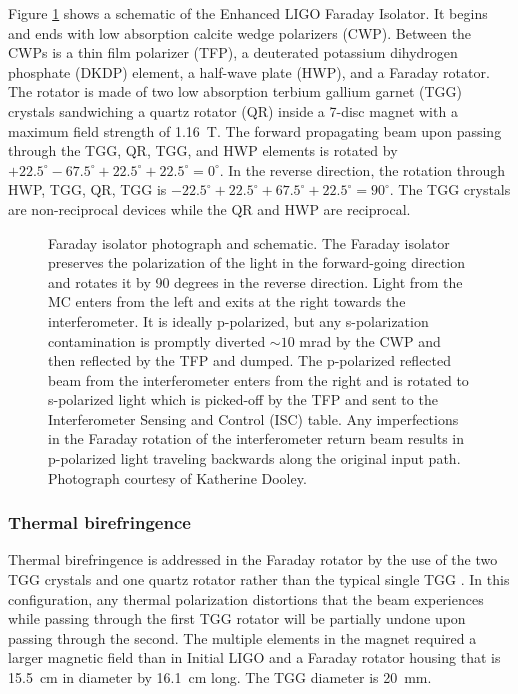 Figure \ref{fig:FI} shows a schematic of the Enhanced LIGO Faraday
Isolator. It begins and ends with low absorption calcite wedge
polarizers (CWP). Between the CWPs is a thin film polarizer (TFP), a
deuterated potassium dihydrogen phosphate (DKDP) element, a half-wave
plate (HWP), and a Faraday rotator. The rotator is made of two low
absorption terbium gallium garnet (TGG) crystals sandwiching a quartz
rotator (QR) inside a 7-disc magnet with a maximum field strength of
1.16~T. The forward propagating beam upon passing through the TGG, QR,
TGG, and HWP elements is rotated by $+22.5^\circ - 67.5^\circ +
22.5^\circ + 22.5^\circ = 0^\circ$. In the reverse direction, the
rotation through HWP, TGG, QR, TGG is $-22.5^\circ + 22.5^\circ +
67.5^\circ + 22.5^\circ = 90^\circ$. The TGG crystals are
non-reciprocal devices while the QR and HWP are reciprocal.

\begin{figure}
\begin{centering}
\caption[Faraday isolator photograph and schematic.]{Faraday isolator
  photograph and schematic. The Faraday isolator preserves the
  polarization of the light in the forward-going direction and rotates
  it by 90 degrees in the reverse direction. Light from the MC enters
  from the left and exits at the right towards the interferometer. It
  is ideally p-polarized, but any s-polarization contamination is
  promptly diverted $\sim 10$ mrad by the CWP and then reflected by
  the TFP and dumped. The p-polarized reflected beam from the
  interferometer enters from the right and is rotated to s-polarized
  light which is picked-off by the TFP and sent to the Interferometer
  Sensing and Control (ISC) table. Any imperfections in the Faraday
  rotation of the interferometer return beam results in p-polarized
  light traveling backwards along the original input path. Photograph
  courtesy of Katherine Dooley.}
\label{fig:FI}
\end{centering}
\end{figure}

\subsubsection{Thermal birefringence} 
Thermal birefringence is addressed in the Faraday rotator by the use
of the two TGG crystals and one quartz rotator rather than the typical
single TGG \citep{Khazanov2000Suppression}.  In this configuration, any
thermal polarization distortions that the beam experiences while
passing through the first TGG rotator will be partially undone upon
passing through the second. 
The multiple elements in the magnet required a larger magnetic field
than in Initial LIGO and a Faraday rotator housing that is 15.5~cm in
diameter by 16.1~cm long. The TGG diameter is 20~mm.

